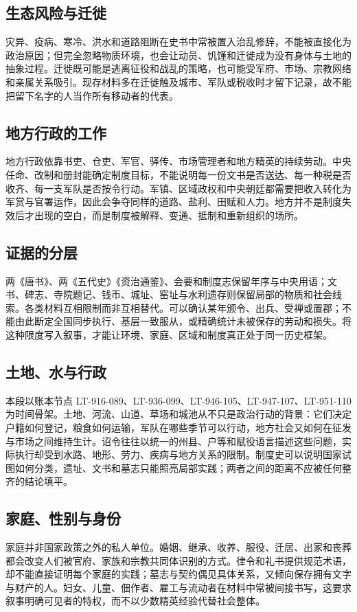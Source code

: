 \subsection{生态风险与迁徙}
灾异、疫病、寒冷、洪水和道路阻断在史书中常被置入治乱修辞，不能被直接化为政治原因；但完全忽略物质环境，也会让动员、饥馑和迁徙成为没有身体与土地的抽象过程。迁徙既可能是逃离征役和战乱的策略，也可能受军府、市场、宗教网络和亲属关系吸引。现存材料多在迁徙触及城市、军队或税收时才留下记录，故不能把留下名字的人当作所有移动者的代表。

\subsection{地方行政的工作}
地方行政依靠书吏、仓吏、军官、驿传、市场管理者和地方精英的持续劳动。中央任命、改制和册封能确定制度目标，不能说明每一份文书是否送达、每一种税是否收齐、每一支军队是否按令行动。军镇、区域政权和中央朝廷都需要把收入转化为军赏与官署运作，因此会争夺同样的道路、盐利、田赋和人力。地方并不是制度失效后才出现的空白，而是制度被解释、变通、抵制和重新组织的场所。

\subsection{证据的分层}
两《唐书》、两《五代史》《资治通鉴》、会要和制度志保留年序与中央用语；文书、碑志、寺院题记、钱币、城址、窑址与水利遗存则保留局部的物质和社会线索。各类材料互相限制而非互相替代。可以确认某年颁令、出兵、受禅或置郡；不能由此断定全国同步执行、基层一致服从，或精确统计未被保存的劳动和损失。将这种限度写入叙事，才能让环境、家庭、区域和制度真正处于同一历史框架。
\subsection{土地、水与行政}
本段以账本节点 LT-916-089、LT-936-099、LT-946-105、LT-947-107、LT-951-110 为时间骨架。土地、河流、山道、草场和城池从不只是政治行动的背景：它们决定户籍如何登记，粮食如何运输，军队在哪些季节可以行动，地方社会又如何在征发与市场之间维持生计。诏令往往以统一的州县、户等和赋役语言描述这些问题，实际执行却受到水路、地形、劳力、疾病与地方关系的限制。制度史可以说明国家试图如何分类，遗址、文书和墓志只能照亮局部实践；两者之间的距离不应被任何整齐的结论填平。

\subsection{家庭、性别与身份}
家庭并非国家政策之外的私人单位。婚姻、继承、收养、服役、迁居、出家和丧葬都会改变人们被官府、家族和宗教共同体识别的方式。律令和礼书提供规范术语，却不能直接证明每个家庭的实践；墓志与契约偶见具体关系，又倾向保存拥有文字与财产的人。妇女、儿童、佃作者、雇工与流动者在材料中常被间接书写，这要求叙事明确可见者的特权，而不以少数精英经验代替社会整体。

